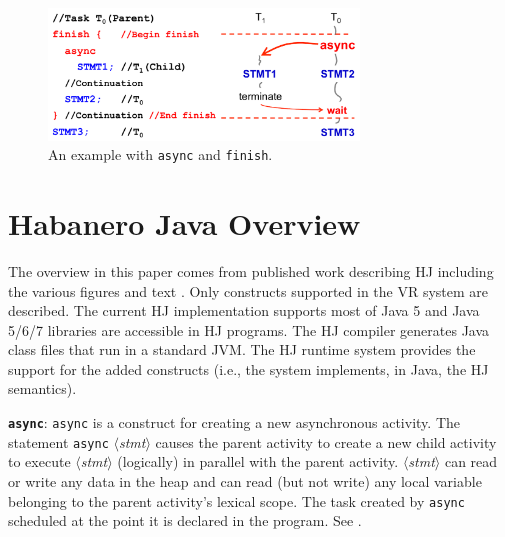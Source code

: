 \begin{figure}[t]
\centering
\includegraphics[width=3.25in]{../figs/async-finish}
\caption{An example with {\tt async} and {\tt finish}.}
\label{fig:async-finish}
\end{figure}

\section{Habanero Java Overview}
The overview in this paper comes from published work
describing HJ including the various figures and text
\cite{Cave:2011:HNA:2093157.2093165}. Only constructs supported in the VR system are described. The
current HJ implementation supports most of Java 5 and Java
5/6/7 libraries are accessible in HJ programs.  The HJ compiler
generates Java class files that run in a standard JVM. The HJ runtime
system provides the support for the added constructs (i.e., the system
implements, in Java, the HJ semantics).

\noindent\textbf{\texttt{async}}: \texttt{async} is a construct for
creating a new asynchronous activity.  The statement {\tt async}
$\langle${\em stmt}$\rangle$ causes the parent activity to create a
new child activity to execute {\em $\langle$stmt$\rangle$} (logically)
in parallel with the parent activity. {\em $\langle$stmt$\rangle$} can
read or write any data in the heap and can read (but not write) any
local variable belonging to the parent activity's lexical scope. The task created by \texttt{async} scheduled at the point it is declared in the
program. See .

